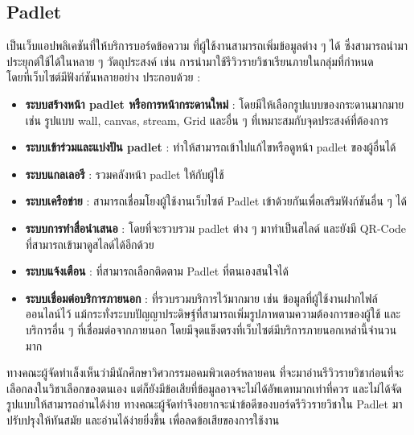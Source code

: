 \subsection{Padlet}
เป็นเว็บแอปพลิเคชันที่ให้บริการบอร์ดข้อความ ที่ผู้ใช้งานสามารถเพิ่มข้อมูลต่าง ๆ ได้ ซึ่งสามารถนำมาประยุกต์ใช้ได้ในหลาย ๆ วัตถุประสงค์ เช่น 
การนำมาใช้รีวิวรายวิชาเรียนภายในกลุ่มที่กำหนด \\
โดยที่เว็บไซต์มีฟังก์ชันหลายอย่าง ประกอบด้วย :
\begin{itemize}
    \item \textbf{ระบบสร้างหน้า padlet หรือการหน้ากระดานใหม่} : โดยมีให้เลือกรูปแบบของกระดานมากมาย เช่น รูปแบบ wall, canvas, stream, Grid และอื่น ๆ 
    ที่เหมาะสมกับจุดประสงค์ที่ต้องการ
    \item \textbf{ระบบเข้าร่วมและแบ่งปัน padlet} : ทำให้สามารถเข้าไปแก้ไขหรือดูหน้า padlet ของผู้อื่นได้
    \item \textbf{ระบบแกลเลอรี} : รวมคลังหน้า padlet ให้กับผู้ใช้
    \item \textbf{ระบบเครือข่าย} : สามารถเชื่อมโยงผู้ใช้งานเว็บไซต์ Padlet เข้าด้วยกันเพื่อเสริมฟังก์ชันอื่น ๆ ได้
    \item \textbf{ระบบการทำสื่อนำเสนอ} : โดยที่จะรวบรวม padlet ต่าง ๆ มาทำเป็นสไลด์ และยังมี QR-Code ที่สามารถเข้ามาดูสไลด์ได้อีกด้วย
    \item \textbf{ระบบแจ้งเตือน} : ที่สามารถเลือกติดตาม Padlet ที่ตนเองสนใจได้
    \item \textbf{ระบบเชื่อมต่อบริการภายนอก} : ที่รวบรวมบริการไว้มากมาย เช่น ข้อมูลที่ผู้ใช้งานฝากไฟล์ออนไลน์ไว้ แม้กระทั่งระบบปัญญาประดิษฐ์ที่สามารถเพิ่มรูปภาพตามความต้องการของผู้ใช้ 
    และบริการอื่น ๆ ที่เชื่อมต่อจากภายนอก โดยมีจุดแข็งตรงที่เว็บไซต์มีบริการภายนอกเหล่านี้จำนวนมาก
    
\end{itemize}
\par ทางคณะผู้จัดทำเล็งเห็นว่ามีนักศึกษาวิศวกรรมอคมพิวเตอร์หลายคน ที่จะมาอ่านรีวิวรายวิชาก่อนที่จะเลือกลงในวิชาเลือกของตนเอง 
แต่ก็ยังมีข้อเสียที่ข้อมูลอาจจะไม่ได้อัพเดทมากเท่าที่ควร และไม่ได้จัดรูปแบบให้สามารถอ่านได้ง่าย ทางคณะผู้จัดทำจึงอยากจะนำข้อดีของบอร์ดรีวิวรายวิชาใน Padlet 
มาปรับปรุงให้ทันสมัย และอ่านได้ง่ายยิ่งขึ้น เพื่อลดข้อเสียของการใช้งาน

